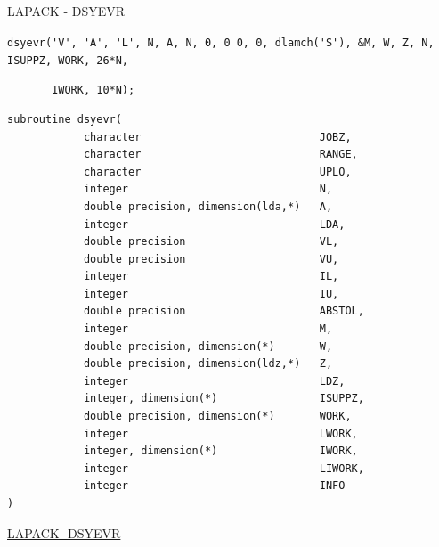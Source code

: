 \documentclass[xcolor=x11names,compress]{beamer}
\renewcommand{\(}{\begin{columns}}
\renewcommand{\)}{\end{columns}}
\newcommand{\<}[1]{\begin{column}{#1}}
\renewcommand{\>}{\end{column}}
\begin{document}
\subsection{}
\begin{frame}[fragile]{LAPACK - DSYEVR}
\begin{tiny}\verb+dsyevr('V', 'A', 'L', N, A, N, 0, 0 0, 0, dlamch('S'), &M, W, Z, N, ISUPPZ, WORK, 26*N,+\end{tiny}
\begin{tiny}\verb+       IWORK, 10*N);+\end{tiny}
\begin{tiny}
\begin{verbatim}
subroutine dsyevr(  
		    character                            JOBZ,
		    character                            RANGE,
		    character                            UPLO,
		    integer                              N,
		    double precision, dimension(lda,*)   A,
		    integer                              LDA,
		    double precision                     VL,
		    double precision                     VU,
		    integer                              IL,
		    integer                              IU,
		    double precision                     ABSTOL,
		    integer                              M,
		    double precision, dimension(*)       W,
		    double precision, dimension(ldz,*)   Z,
		    integer                              LDZ,
		    integer, dimension(*)                ISUPPZ,
		    double precision, dimension(*)       WORK,
		    integer                              LWORK,
		    integer, dimension(*)                IWORK,
		    integer                              LIWORK,
		    integer                              INFO 
)	         
\end{verbatim}
\end{tiny} 
\href{http://www.netlib.org/lapack/explore-html/d2/d8a/group__double_s_yeigen_ga2ad9f4a91cddbf67fe41b621bd158f5c.html#ga2ad9f4a91cddbf67fe41b621bd158f5c}{LAPACK- DSYEVR}
\end{frame}
\end{document}
